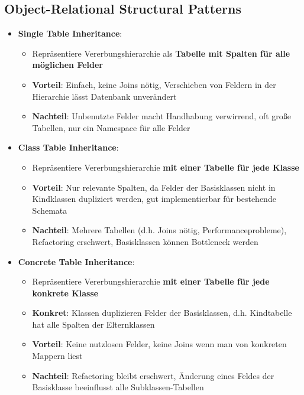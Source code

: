 \subsection{Object-Relational Structural Patterns}
\label{eap:sub:object_relational_structural_patterns}


\begin{itemize}
	\item \textbf{Single Table Inheritance}:
	\begin{itemize}
		\item Repräsentiere Vererbungshierarchie als \textbf{Tabelle mit Spalten für alle möglichen Felder}
		\item \textbf{Vorteil}: Einfach, keine Joins nötig, Verschieben von Feldern in der Hierarchie lässt Datenbank unverändert
		\item \textbf{Nachteil}: Unbenutzte Felder macht Handhabung verwirrend, oft große Tabellen, nur ein Namespace für alle Felder
	\end{itemize}
	\item \textbf{Class Table Inheritance}:
	\begin{itemize}
		\item Repräsentiere Vererbungshierarchie \textbf{mit einer Tabelle für jede Klasse}
		\item \textbf{Vorteil}: Nur relevante Spalten, da Felder der Basisklassen nicht in Kindklassen dupliziert werden, gut implementierbar für bestehende Schemata
		\item \textbf{Nachteil}: Mehrere Tabellen (d.h. Joins nötig, Performanceprobleme), Refactoring erschwert, Basisklassen können Bottleneck werden
	\end{itemize}
	\item \textbf{Concrete Table Inheritance}:
	\begin{itemize}
		\item Repräsentiere Vererbungshierarchie \textbf{mit einer Tabelle für jede konkrete Klasse}
		\item \textbf{Konkret}: Klassen duplizieren Felder der Basisklassen, d.h. Kindtabelle hat alle Spalten der Elternklassen
		\item \textbf{Vorteil}: Keine nutzlosen Felder, keine Joins wenn man von konkreten Mappern liest
		\item \textbf{Nachteil}: Refactoring bleibt erschwert, Änderung eines Feldes der Basisklasse beeinflusst alle Subklassen-Tabellen
	\end{itemize}
\end{itemize}